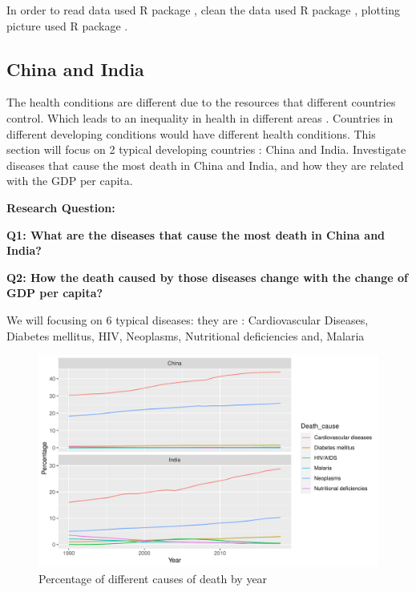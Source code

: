 \documentclass[11pt,a4paper,]{article}
\begin{document}
In order to read data used R package \textcite{readr}, clean the data used R package \textcite{tidyverse}, plotting picture used R package \textcite{ggplot2}.

\clearpage

\hypertarget{china-and-india}{%
\subsection{China and India}\label{china-and-india}}

The health conditions are different due to the resources that different countries control. Which leads to an inequality in health in different areas \textcite{emadi2021global}. Countries in different developing conditions would have different health conditions. This section will focus on 2 typical developing countries : China and India. Investigate diseases that cause the most death in China and India, and how they are related with the GDP per capita.

\textbf{Research Question:}

\textbf{Q1: What are the diseases that cause the most death in China and India?}

\textbf{Q2: How the death caused by those diseases change with the change of GDP per capita?}

We will focusing on 6 typical diseases: they are : Cardiovascular Diseases, Diabetes mellitus, HIV, Neoplasms, Nutritional deficiencies and, Malaria

\begin{figure}
\centering
\includegraphics{Assignment4_files/figure-latex/percendeath-1.pdf}
\caption{\label{fig:percendeath}Percentage of different causes of death by year}
\end{figure}
\end{document}
